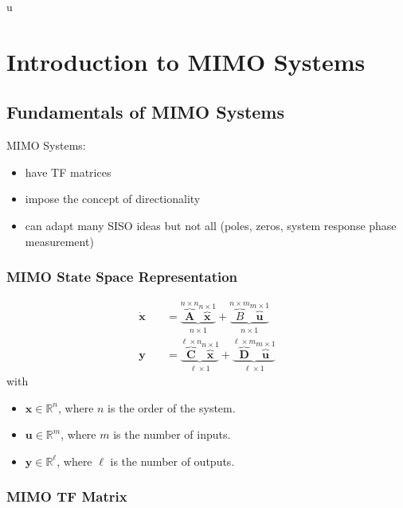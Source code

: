 u\section{Introduction to MIMO Systems}
\subsection{Fundamentals of MIMO Systems}


MIMO Systems:
\begin{itemize}
    \item have TF matrices
    \item impose the concept of directionality
    \item can adapt many SISO ideas but not all (poles, zeros, system response phase measurement)
\end{itemize}

\subsubsection{MIMO State Space Representation}
\noindent\begin{align*}
    \dot{\mathbf{x}} & =\underbrace{\overbrace{\mathbf{A}}^{n\times n}\overbrace{\mathbf{x}}^{n\times1}}_{n\times1}+\underbrace{\overbrace{B}^{n\times m}\overbrace{\mathbf{u}}^{m\times1}}_{n\times1}                      \\
    \mathbf{y}\quad  & =\underbrace{\overbrace{\mathbf{C}}^{\ell\times n}\overbrace{\mathbf{x}}^{n\times1}}_{\ell\times1}+\underbrace{\overbrace{\mathbf{D}}^{\ell\times m}\overbrace{\mathbf{u}}^{m\times1}}_{\ell\times1}
\end{align*}
with
\begin{itemize}
    \item $\mathbf{x}\in\mathbb{R}^n$, where $n$ is the order of the system.
    \item $\mathbf{u}\in\mathbb{R}^m$, where $m$ is the number of inputs.
    \item $\mathbf{y}\in\mathbb{R}^\ell$, where $\ell$ is the number of outputs.
\end{itemize}

\subsubsection{MIMO TF Matrix}


